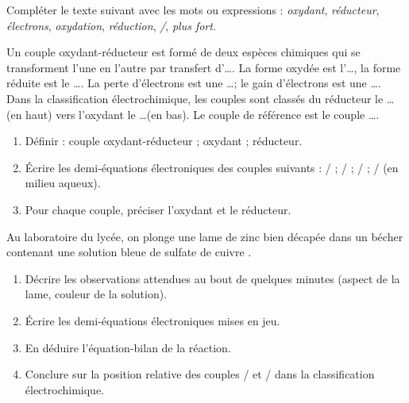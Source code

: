 \documentclass[11pt]{article}
\newcounter{popsec}
\newcounter{popsub}
\newcommand{\courssub}[1]{%
  \stepcounter{popsub}%
  \par\vspace{9pt}\noindent{\popxbold\fontsize{11.5}{13}\selectfont\color{popink}{\color{poporange}\thepopsec.\thepopsub}\hspace{6pt}#1}\par\nopagebreak\vspace{4pt}
}
\begin{document}
\begin{exercice}
Compléter le texte suivant avec les mots ou expressions : \emph{oxydant}, \emph{réducteur}, \emph{électrons}, \emph{oxydation}, \emph{réduction}, \emph{/}, \emph{plus fort}.

\medskip
Un couple oxydant-réducteur est formé de deux espèces chimiques qui se transforment l'une en l'autre par transfert d'\ldots. La forme oxydée est l'\ldots, la forme réduite est le \ldots. La perte d'électrons est une \ldots ; le gain d'électrons est une \ldots. Dans la classification électrochimique, les couples sont classés du réducteur le \ldots (en haut) vers l'oxydant le \ldots (en bas). Le couple de référence est le couple \ldots.
\end{exercice}

\begin{exercice}
\begin{enumerate}
    \item Définir : couple oxydant-réducteur ; oxydant ; réducteur.
    \item Écrire les demi-équations électroniques des couples suivants : / ; / ; / ; / (en milieu aqueux).
    \item Pour chaque couple, préciser l'oxydant et le réducteur.
\end{enumerate}
\end{exercice}

\courssub{Je m'entraîne}

\begin{exercice}
Au laboratoire du lycée, on plonge une lame de zinc bien décapée dans un bécher contenant une solution bleue de sulfate de cuivre .
\begin{enumerate}
    \item Décrire les observations attendues au bout de quelques minutes (aspect de la lame, couleur de la solution).
    \item Écrire les demi-équations électroniques mises en jeu.
    \item En déduire l'équation-bilan de la réaction.
    \item Conclure sur la position relative des couples / et / dans la classification électrochimique.
\end{enumerate}
\end{exercice}
\end{document}
